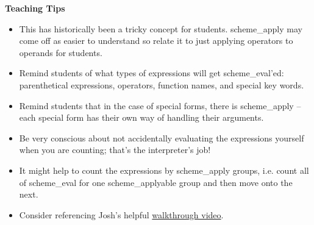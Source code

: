 \begin{blocksection}
\begin{guide}
\textbf{Teaching Tips}
\begin{itemize}
	\item This has historically been a tricky concept for students. scheme\_apply may come off as easier to understand so relate it to just applying operators to operands for students.
	\item Remind students of what types of expressions will get scheme\_eval'ed: parenthetical expressions, operators, function names, and special key words.
	\item Remind students that in the case of special forms, there is scheme\_apply -- each special form has their own way of handling their arguments.
	\item Be very conscious about not accidentally evaluating the expressions yourself when you are counting; that's the interpreter's job!
	\item It might help to count the expressions by scheme\_apply groups, i.e. count all of scheme\_eval for one scheme\_applyable group and then move onto the next.
	\item Consider referencing Josh's helpful \href{https://drive.google.com/file/d/1YH6eaOAzPx8MC0fO60bIbq9oZipC2lEd/view}{walkthrough video}.
\end{itemize}
\end{guide}
\end{blocksection}

